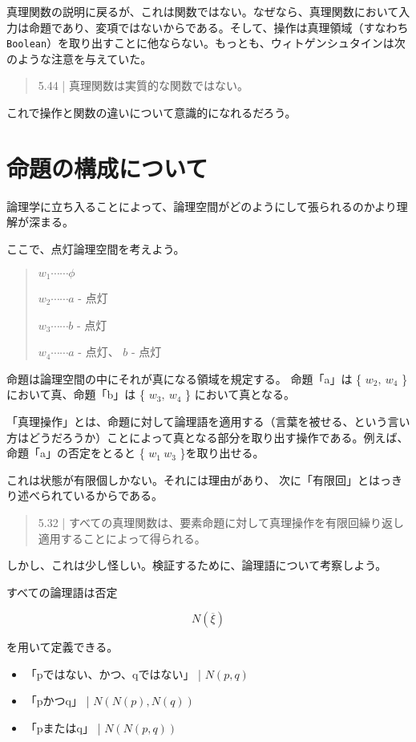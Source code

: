 \documentclass[a4paper,onecolumn,article]{jarticle}
\newcounter{ct}               %
\begin{document}
真理関数の説明に戻るが、これは関数ではない。なぜなら、真理関数において入力は命題であり、変項ではないからである。そして、操作は真理領域（すなわち\texttt{Boolean}）を取り出すことに他ならない。もっとも、ウィトゲンシュタインは次のような注意を与えていた。

\begin{quote}
  5.44 | 真理関数は実質的な関数ではない。
\end{quote}

これで操作と関数の違いについて意識的になれるだろう。

\section{命題の構成について}

論理学に立ち入ることによって、論理空間がどのようにして張られるのかより理解が深まる。

ここで、点灯論理空間を考えよう。
\begin{quote}
  $w_1 \cdots \cdots \phi$

  $w_2 \cdots \cdots a$ - 点灯

  $w_3 \cdots \cdots b$ - 点灯

  $w_4 \cdots \cdots a$ - 点灯、 $b$ - 点灯
\end{quote}

命題は論理空間の中にそれが真になる領域を規定する。
命題「a」は \{ $w_2, \  w_4$ \}において真、命題「b」は \{ $w_3, \ w_4$ \} において真となる。

「真理操作」とは、命題に対して論理語を適用する（言葉を被せる、という言い方はどうだろうか）ことによって真となる部分を取り出す操作である。例えば、命題「a」の否定をとると \{ $w_1 \ w_3$ \}を取り出せる。

これは状態が有限個しかない。それには理由があり、 次に「有限回」とはっきり述べられているからである。

\begin{quote}
  5.32 | すべての真理関数は、要素命題に対して真理操作を有限回繰り返し適用することによって得られる。
\end{quote}

しかし、これは少し怪しい。検証するために、論理語について考察しよう。

すべての論理語は否定

\[ N ( \overline{ \xi } ) \]

を用いて定義できる。

\begin{itemize}
  \item 「pではない、かつ、qではない」 | $N(p, q)$
  \item 「pかつq」 | $N(N(p), N(q))$
  \item 「pまたはq」 | $N(N(p, q))$
\end{itemize}
\end{document}
